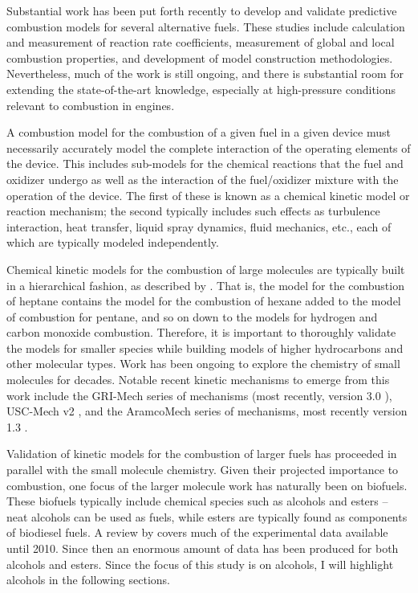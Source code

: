 \documentclass[../main.tex]{subfiles}
\begin{document}
Substantial work has been put forth recently to develop and validate predictive
combustion models for several alternative fuels. These studies include
calculation and measurement of reaction rate coefficients, measurement of
global and local combustion properties, and development of model construction
methodologies. Nevertheless, much of the work is still ongoing, and there is
substantial room for extending the state-of-the-art knowledge, especially at
high-pressure conditions relevant to combustion in engines.

A combustion model for the combustion of a given fuel in a given device
must necessarily accurately model the complete interaction of the operating
elements of the device. This includes sub-models for the chemical reactions that the
fuel and oxidizer undergo as well as the interaction of the fuel/oxidizer
mixture with the operation of the device. The first of these is known as
a chemical kinetic model or reaction mechanism; the second typically includes
such effects as turbulence interaction, heat transfer, liquid spray
dynamics, fluid mechanics, etc., each of which are typically modeled independently.

Chemical kinetic models for the combustion of large molecules are typically
built in a hierarchical fashion, as described by \textcite{Westbrook1984}. That
is, the model for the combustion of heptane contains the model for the
combustion of hexane added to the model of combustion for pentane, and so on
down to the models for hydrogen and carbon monoxide combustion. Therefore, it
is important to thoroughly validate the models for smaller species while
building models of higher hydrocarbons and other molecular types. Work has been
ongoing to explore the chemistry of small molecules for decades. Notable recent
kinetic mechanisms to emerge from this work include the GRI-Mech series of
mechanisms (most recently, version 3.0 \cite{Smith}), USC-Mech v2
\cite{Wang2007}, and the AramcoMech series of mechanisms, most recently version
1.3 \cite{Metcalfe2013}.

Validation of kinetic models for the combustion of larger fuels
has proceeded in parallel with the small molecule chemistry. Given their projected
importance to combustion, one focus of the larger molecule work has naturally
been on biofuels. These biofuels typically include chemical species such as
alcohols and esters – neat alcohols can be used as fuels, while esters are
typically found as components of biodiesel fuels. A review by \textcite{Kohse-Hoinghaus2010}
covers much of the experimental data available until 2010. Since then an
enormous amount of data has been produced for both alcohols and esters.
Since the focus of this study is on alcohols, I will highlight alcohols
in the following sections.
\end{document}
